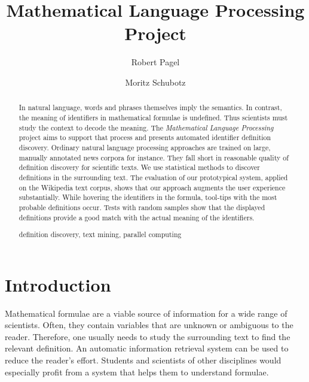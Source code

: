 \documentclass[runningheads]{llncs}
\newcommand{\keywords}[1]{\par\addvspace\baselineskip
\noindent\keywordname\enspace\ignorespaces#1}
\begin{document}
\mainmatter

\title{Mathematical Language Processing \\ Project}

\author{Robert Pagel \and Moritz Schubotz}



\maketitle


\begin{abstract}
In natural language, words and phrases themselves imply the semantics.
In contrast, the meaning of identifiers in mathematical formulae is undefined.
Thus scientists must study the context to decode the meaning.
The \emph{Mathematical Language Processing} project aims to support that process and
presents automated identifier definition discovery.
Ordinary natural language processing approaches are trained on large, manually annotated news
corpora for instance.
They fall short in reasonable quality of definition discovery for scientific texts.
We use statistical methods to discover definitions in the surrounding text.
The evaluation of our prototypical system, applied on the Wikipedia text
corpus, shows that our approach augments the user experience
substantially.
While hovering the identifiers in the formula, tool-tips with the most probable definitions
occur.
Tests with random samples show that the displayed definitions provide
a good match with the actual meaning of the identifiers.   
\keywords{definition discovery, text mining, parallel computing}
\end{abstract}


\section{Introduction}

Mathematical formulae are a viable source of information for a wide range of
scientists.
Often, they contain variables that are unknown or ambiguous to the reader.
Therefore, one usually needs to study the surrounding text to find the relevant definition.
An automatic information retrieval system can be used to reduce the reader's
effort.
Students and scientists of other disciplines would especially profit from a 
system that helps them to understand formulae.
\end{document}
